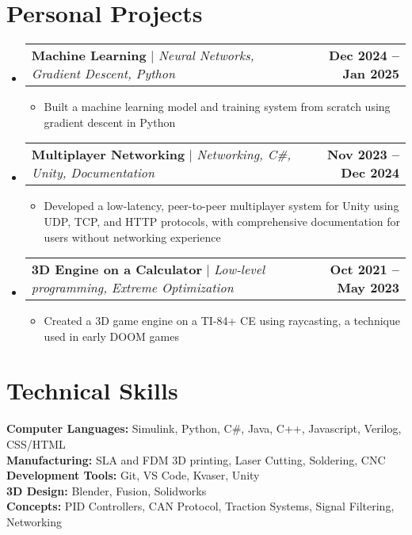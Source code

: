 \documentclass[letterpaper,11pt]{article}
\makeatletter
\newcommand{\resumeItem}[1]{
  \item\normalsize{
    {#1 \vspace{-2pt}}
  }
}
\newcommand{\resumeProjectHeading}[2]{
    \item
    \begin{tabular*}{1.001\textwidth}{l@{\extracolsep{\fill}}r}
      \normalsize#1 & \textbf{\normalsize #2}\\
    \end{tabular*}\vspace{-7pt}
}
\newcommand{\resumeSubHeadingListStart}{\begin{itemize}[leftmargin=0.0in, label={}]}
\newcommand{\resumeSubHeadingListEnd}{\end{itemize}}
\newcommand{\resumeItemListStart}{\begin{itemize}}
\newcommand{\resumeItemListEnd}{\end{itemize}\vspace{-5pt}}
\makeatother
\begin{document}
\section{Personal Projects}
    \vspace{-5pt}
    \resumeSubHeadingListStart
      \resumeProjectHeading
          {\textbf{Machine Learning} $|$ \emph{Neural Networks, Gradient Descent, Python}}{Dec 2024 -- Jan 2025}
          \resumeItemListStart 
            \resumeItem{Built a machine learning model and training system from scratch using gradient descent in Python}
          \resumeItemListEnd
          \vspace{-16pt}
      \resumeProjectHeading
          {\textbf{Multiplayer Networking} $|$ \emph{Networking, C\#, Unity, Documentation}}{Nov 2023 -- Dec 2024}
          \resumeItemListStart
            \resumeItem{Developed a low-latency, peer-to-peer multiplayer system for Unity using UDP, TCP, and HTTP protocols, with comprehensive documentation for users without networking experience}
          \resumeItemListEnd
          \vspace{-16pt}
      \resumeProjectHeading
          {\textbf{3D Engine on a Calculator} $|$ \emph{Low-level programming, Extreme Optimization}}{Oct 2021 -- May 2023}
          \resumeItemListStart
            \resumeItem{Created a 3D game engine on a TI-84+ CE using raycasting, a technique used in early DOOM games}
          \resumeItemListEnd
          \vspace{-16pt}
    \resumeSubHeadingListEnd
\vspace{5pt} 


\section{Technical Skills}
 \begin{itemize}[leftmargin=0.15in, label={}]
    \normalsize{\item{
     \textbf{Computer Languages:}{ Simulink, Python, C\#, Java, C++, Javascript, Verilog, CSS/HTML} \\
     \textbf{Manufacturing:}{ SLA and FDM 3D printing, Laser Cutting, Soldering, CNC} \\
     \textbf{Development Tools:}{ Git, VS Code, Kvaser, Unity} \\
     \textbf{3D Design:}{ Blender, Fusion, Solidworks} \\
     \textbf{Concepts:}{ PID Controllers, CAN Protocol, Traction Systems, Signal Filtering, Networking} }}
 \end{itemize}
 \vspace{-16pt} 
\end{document}
